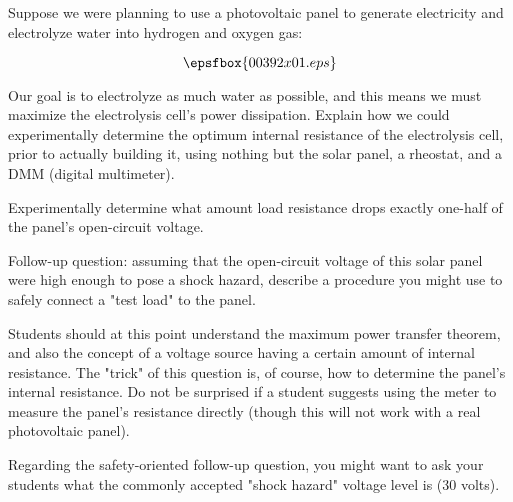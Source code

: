 

Suppose we were planning to use a photovoltaic panel to generate electricity and electrolyze water into hydrogen and oxygen gas:

$$\epsfbox{00392x01.eps}$$

Our goal is to electrolyze as much water as possible, and this means we must maximize the electrolysis cell's power dissipation.  Explain how we could experimentally determine the optimum internal resistance of the electrolysis cell, prior to actually building it, using nothing but the solar panel, a rheostat, and a DMM (digital multimeter).







Experimentally determine what amount load resistance drops exactly one-half of the panel's open-circuit voltage.

\vskip 10pt

Follow-up question: assuming that the open-circuit voltage of this solar panel were high enough to pose a shock hazard, describe a procedure you might use to safely connect a "test load" to the panel.







Students should at this point understand the maximum power transfer theorem, and also the concept of a voltage source having a certain amount of internal resistance.  The "trick" of this question is, of course, how to determine the panel's internal resistance.  Do not be surprised if a student suggests using the meter to measure the panel's resistance directly (though this will not work with a real photovoltaic panel).

Regarding the safety-oriented follow-up question, you might want to ask your students what the commonly accepted "shock hazard" voltage level is (30 volts).




